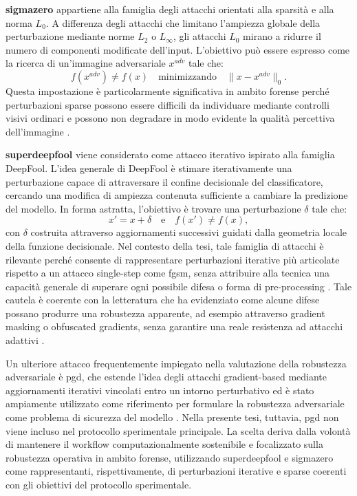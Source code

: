 \textbf{\gls{sigmazero}} appartiene alla famiglia degli attacchi orientati alla sparsità e
alla norma \(L_0\). A differenza degli attacchi che limitano l'ampiezza globale
della perturbazione mediante norme \(L_2\) o \(L_\infty\), gli attacchi \(L_0\)
mirano a ridurre il numero di componenti modificate dell'input. L'obiettivo può
essere espresso come la ricerca di un'immagine adversariale \(x^{adv}\) tale che:
\[
f(x^{adv}) \neq f(x)
\quad \text{minimizzando} \quad
\|x - x^{adv}\|_0.
\]
Questa impostazione è particolarmente significativa in ambito forense perché
perturbazioni sparse possono essere difficili da individuare mediante controlli
visivi ordinari e possono non degradare in modo evidente la qualità percettiva
dell'immagine \cite{zhao2024sigmazero}.

\textbf{\gls{superdeepfool}} viene considerato come attacco iterativo ispirato alla famiglia
DeepFool. L'idea generale di DeepFool è stimare iterativamente una perturbazione
capace di attraversare il confine decisionale del classificatore, cercando una
modifica di ampiezza contenuta sufficiente a cambiare la predizione del modello.
In forma astratta, l'obiettivo è trovare una perturbazione \(\delta\) tale che:
\[
x' = x + \delta
\quad \text{e} \quad
f(x') \neq f(x),
\]
con \(\delta\) costruita attraverso aggiornamenti successivi guidati dalla
geometria locale della funzione decisionale. Nel contesto della tesi, tale
famiglia di attacchi è rilevante perché consente di rappresentare perturbazioni
iterative più articolate rispetto a un attacco single-step come \gls{fgsm},
senza attribuire alla tecnica una capacità generale di superare ogni possibile
difesa o forma di pre-processing \cite{moosavi2016deepfool,zhang2024superdeepfool}.
Tale cautela è coerente con la letteratura che ha evidenziato come alcune difese
possano produrre una robustezza apparente, ad esempio attraverso gradient masking o
obfuscated gradients, senza garantire una reale resistenza ad attacchi adattivi
\cite{athalye2018obfuscated}.

Un ulteriore attacco frequentemente impiegato nella valutazione della robustezza
adversariale è \gls{pgd}, che estende l'idea degli attacchi
gradient-based mediante aggiornamenti iterativi vincolati entro un intorno
perturbativo ed è stato ampiamente utilizzato come riferimento per formulare la
robustezza adversariale come problema di sicurezza del modello
\cite{madry2018towards}. Nella presente tesi, tuttavia, \gls{pgd} non viene
incluso nel protocollo sperimentale principale. La scelta deriva dalla volontà di
mantenere il workflow computazionalmente sostenibile e focalizzato sulla
robustezza operativa in ambito forense, utilizzando \gls{superdeepfool} e
\gls{sigmazero} come rappresentanti, rispettivamente, di perturbazioni iterative
e sparse coerenti con gli obiettivi del protocollo sperimentale.


